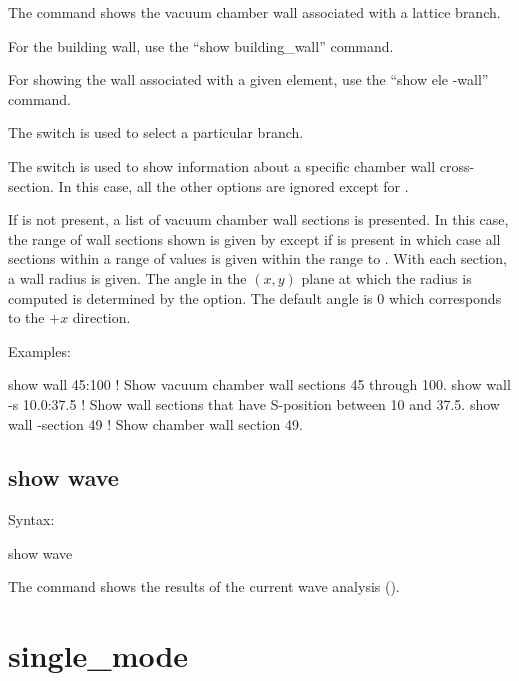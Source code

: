 {{{{{{{{{{The  command shows the vacuum chamber wall associated with a lattice branch.

For the building wall, use the ``show building_wall'' command.

For showing the wall associated with a given element, use the ``show ele -wall'' command.

The  switch is used to select a particular branch.

The  switch is used to show information about a specific chamber wall cross-section. In
this case, all the other options are ignored except for .

If  is not present, a list of vacuum chamber wall sections is presented. In this case,
the range of wall sections shown is given by  except if  is present in which
case all sections within a range of  values is given within the range  to
. With each section, a wall radius is given. The angle in the $(x,y)$ plane at which the
radius is computed is determined by the  option. The default angle is 0 which corresponds
to the $+x$ direction.

Examples:
\begin{example}
  show wall 45:100       ! Show vacuum chamber wall sections 45 through 100.
  show wall -s 10.0:37.5 ! Show wall sections that have S-position between 10 and 37.5.
  show wall -section 49  ! Show chamber wall section 49.
\end{example}


\subsection{show wave}
\label{s:show.wave}

Syntax:
\begin{example}
  show wave
\end{example}

The  command shows the results of the current wave analysis ().


\section{single_mode}
\label{s:sing}

}}}}}}}}}}
